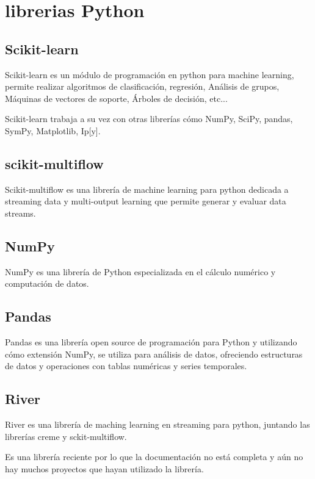 \section{librerias Python}

\subsection{Scikit-learn}

Scikit-learn es un módulo de programación en python para machine learning, permite realizar algoritmos de clasificación, regresión, Análisis de grupos, Máquinas de vectores de soporte, Árboles de decisión, etc...

Scikit-learn trabaja a su vez con otras librerías cómo NumPy, SciPy, pandas, SymPy, Matplotlib, Ip[y].\cite{pagina:scikit-learn}

\subsection{scikit-multiflow}

Scikit-multiflow es una librería de machine learning para python dedicada a streaming data y multi-output learning que permite generar y evaluar data streams.\cite{skmultiflow}

\subsection{NumPy}
NumPy es una librería de Python especializada en el cálculo numérico y computación de datos. 

\subsection{Pandas}

Pandas es una librería open source de programación para Python y utilizando cómo extensión NumPy, se utiliza para análisis de datos, ofreciendo estructuras de datos y operaciones con tablas numéricas y series temporales.\cite{pagina:wiki_pandas}


\subsection{River}
River es una librería de maching learning en streaming para python, juntando las librerías creme y sckit-multiflow.

Es una librería reciente por lo que la documentación no está completa y aún no hay muchos proyectos que hayan utilizado la librería.\cite{pagina:River}

